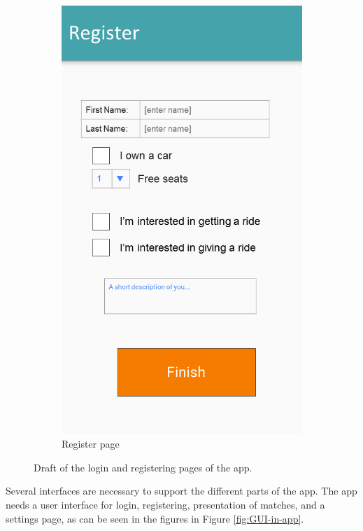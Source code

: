 \begin{figure}[h!]
\begin{subfigure}[b]{0.3\textwidth}
	 	\includegraphics[width=\textwidth]{figures/GUI-register.png}
	 	\caption{Register page}
	 	\label{fig:GUI-register}
	 \end{subfigure}
	 \caption{Draft of the login and registering pages of the app.}\label{fig:GUI-firstrun}
\end{figure}

Several interfaces are necessary to support the different parts of the app. 
The app needs a user interface for login, registering, presentation of matches, and a settings page, as can be seen in the figures in Figure \ref{fig:GUI-in-app}.

